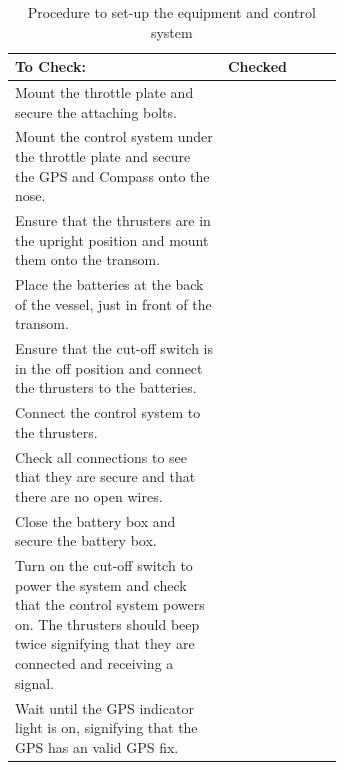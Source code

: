  \begin{table}
 	\begin{center}
 		\caption{Procedure to set-up the equipment and control system}
 		\label{tab:4:equipCheck}
 		\begin{tabular}{|p{0.65\linewidth}|l|}
			\hline
 			To Check: & Checked \\
 			\hline
 			Mount the throttle plate and secure the attaching bolts.&\\
 			\hline
 			Mount the control system under the throttle plate and secure the GPS and Compass onto the nose.&\\
 			\hline
 			Ensure that the thrusters are in the upright position and mount them onto the transom.&\\
 			\hline
 			Place the batteries at the back of the vessel, just in front of the transom.&\\
 			\hline
 			Ensure that the cut-off switch is in the off position and connect the thrusters to the batteries.&\\
 			\hline
 			Connect the control system to the thrusters. &\\
 			\hline
 			Check all connections to see that they are secure and that there are no open wires. &\\
 			\hline
 			Close the battery box and secure the battery box. &\\
 			\hline
 			Turn on the cut-off switch to power the system and check that the control system powers on. The thrusters should beep twice signifying that they are connected and receiving a signal.&\\
 			\hline
 			Wait until the GPS indicator light is on, signifying that the GPS has an valid GPS fix. &\\
 			\hline
 		\end{tabular}
 	\end{center}
 \end{table}
